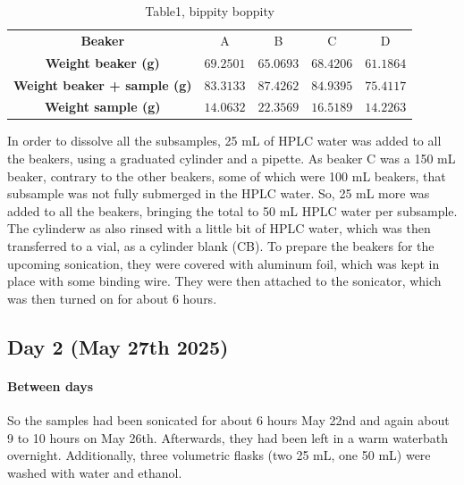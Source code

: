 \documentclass[twocolumn,a4paper,aps,amsmath,amssymb,floatfix,superscriptaddress]{revtex4-2}
\begin{document}
	\begin{table}
		\centering
		\begin{threeparttable}
			\caption[table]{Table1, bippity boppity}
			\label{tab:Sample_masses}
			\begin{tabular}{c||c|c|c|c}
				\textbf{Beaker} & A & B & C & D \\
				\hhline{=====}
				\textbf{Weight beaker (g)} & $69.2501$ & $65.0693$ & $68.4206$ & $61.1864$ \\
				\hline
				\textbf{Weight beaker + sample (g)} & $83.3133$ & $87.4262$ & $84.9395$ & $75.4117$ \\
				\hline
				\textbf{Weight sample (g)} & $14.0632$ & $22.3569$ & $16.5189$ & $14.2263$ \\
			\end{tabular}
		\end{threeparttable}
	\end{table}
	
	In order to dissolve all the subsamples, 25 mL of HPLC water was added to all the beakers, using a graduated cylinder and a pipette. As beaker C was a 150 mL beaker, contrary to the other beakers, some of which were 100 mL beakers, that subsample was not fully submerged in the HPLC water. So, 25 mL more was added to all the beakers, bringing the total to 50 mL HPLC water per subsample. \\ The cylinderw as also rinsed with a little bit of HPLC water, which was then transferred to a vial, as a cylinder blank (CB).
	To prepare the beakers for the upcoming sonication, they were covered with aluminum foil, which was kept in place with some binding wire. They were then attached to the sonicator, which was then turned on for about 6 hours.
	
	\subsection{Day 2 (May 27th 2025)}
	\paragraph*{Between days}
	So the samples had been sonicated for about 6 hours May 22nd and again about 9 to 10 hours on May 26th. Afterwards, they had been left in a warm waterbath overnight. Additionally, three volumetric flasks (two 25 mL, one 50 mL) were washed with water and ethanol. 
\end{document}
